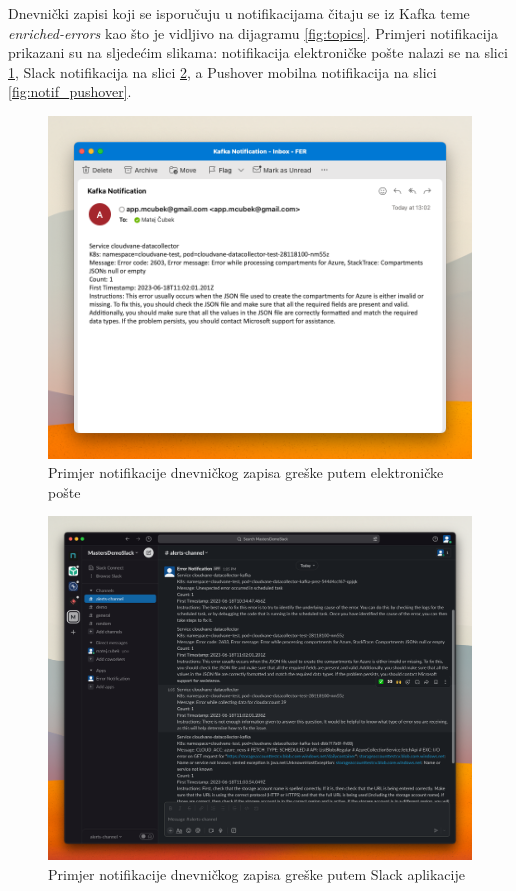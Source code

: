 \documentclass[times, utf8, diplomski]{fer}
\begin{document}
Dnevnički zapisi koji se isporučuju u notifikacijama čitaju se iz Kafka teme \emph{\glqq enriched-errors\grqq} kao što je vidljivo na dijagramu \ref{fig:topics}. Primjeri notifikacija prikazani su na sljedećim slikama: notifikacija elektroničke pošte nalazi se na slici \ref{fig:notif_email}, Slack notifikacija na slici \ref{fig:notif_slack}, a Pushover mobilna notifikacija na slici \ref{fig:notif_pushover}.

\begin{figure}[htb]
	\centering
	\includegraphics[width=12cm]{images/email_notif.png}
	\caption[Primjer notifikacije dnevničkog zapisa greške kroz elektroničku poštu]{Primjer notifikacije dnevničkog zapisa greške putem elektroničke pošte}
	\label{fig:notif_email}
\end{figure}

\begin{figure}[htb]
	\centering
	\includegraphics[width=14cm]{images/slack_notif.png}
	\caption[Primjer notifikacije dnevničkog zapisa greške putem Slack aplikacije]{Primjer notifikacije dnevničkog zapisa greške putem Slack aplikacije}
	\label{fig:notif_slack}
\end{figure}
\end{document}
